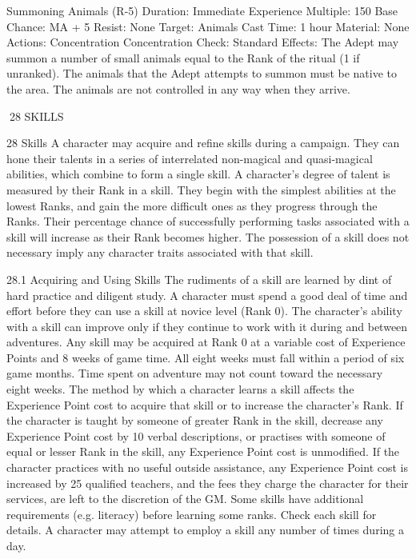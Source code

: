 \documentclass[a4paper]{article}
\begin{document}
\begin{multicols}{3}
Summoning Animals (R-5)
Duration: Immediate
Experience Multiple: 150
Base Chance: MA + 5%
Resist: None
Target: Animals
Cast Time: 1 hour
Material: None
Actions: Concentration
Concentration Check: Standard
Effects: The Adept may summon a number of
small animals equal to the Rank of the ritual (1 if
unranked). The animals that the Adept attempts to
summon must be native to the area. The animals
are not controlled in any way when they arrive.

28 SKILLS

28 Skills
A character may acquire and refine skills during a
campaign. They can hone their talents in a series of
interrelated non-magical and quasi-magical abilities, which combine to form a single skill. A character’s degree of talent is measured by their Rank
in a skill. They begin with the simplest abilities at
the lowest Ranks, and gain the more difficult ones
as they progress through the Ranks. Their percentage chance of successfully performing tasks associated with a skill will increase as their Rank becomes higher.
The possession of a skill does not necessary imply
any character traits associated with that skill.

28.1 Acquiring and Using Skills
The rudiments of a skill are learned by dint of hard
practice and diligent study. A character must spend
a good deal of time and effort before they can use a
skill at novice level (Rank 0). The character’s
ability with a skill can improve only if they continue to work with it during and between adventures.
Any skill may be acquired at Rank 0 at a variable cost of Experience Points and 8 weeks of
game time.
All eight weeks must fall within a period of six
game months. Time spent on adventure may not
count toward the necessary eight weeks.
The method by which a character learns a skill
affects the Experience Point cost to acquire that
skill or to increase the character’s Rank.
If the character is taught by someone of greater
Rank in the skill, decrease any Experience Point
cost by 10%
verbal descriptions, or practises with someone of
equal or lesser Rank in the skill, any Experience
Point cost is unmodified. If the character practices
with no useful outside assistance, any Experience
Point cost is increased by 25%
qualified teachers, and the fees they charge the
character for their services, are left to the discretion
of the GM. Some skills have additional requirements (e.g. literacy) before learning some ranks.
Check each skill for details.
A character may attempt to employ a skill any
number of times during a day.


\end{multicols}
\end{document}
